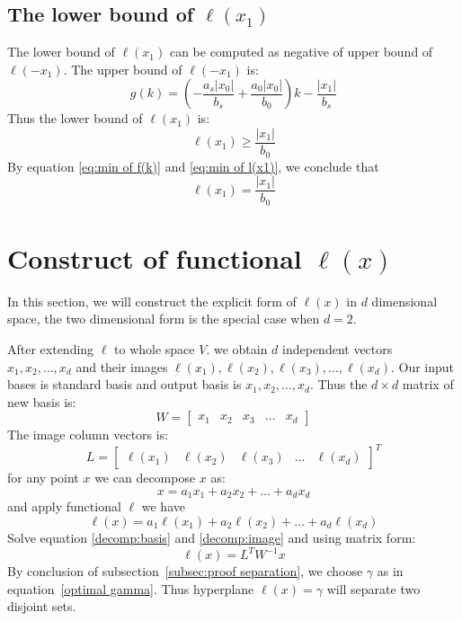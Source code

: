 \documentclass{article}
\newcommand{\abs}[1]{\left\lvert#1\right\rvert}
\begin{document}
\subsection{The lower bound of $\ell(x_1)$}
The lower bound of $\ell(x_1)$ can be computed as negative of upper bound of $\ell(-x_1)$. The upper bound of $\ell(-x_1)$ is:
\begin{equation}
	g(k)=\left(-\frac{a_s\abs{x_0}}{b_s}+\frac{a_0\abs{x_0}}{b_0}\right)k-\frac{\abs{x_1}}{b_s}
\end{equation}
Thus the lower bound of $\ell(x_1)$ is:
\begin{equation}
	\label{eq:min of l(x1)}
	\ell(x_1)\geq\frac{\abs{x_1}}{b_0}
\end{equation}
By equation \eqref{eq:min of f(k)} and \eqref{eq:min of l(x1)}, we conclude that
\begin{equation}
	\ell(x_1)=\frac{\abs{x_1}}{b_0}
\end{equation}
\section{Construct of functional $\ell(x)$}
In this section, we will construct the explicit form of $\ell(x)$ in $d$ dimensional space, the two dimensional form is the special case when $d=2$.\par
After extending $\ell$ to whole space $V$. we obtain $d$ independent vectors $x_1,x_2,\dots,x_d$ and their images 
$\ell(x_1),\ell(x_2),\ell(x_3),\dots,\ell(x_d)$. Our input bases is standard basis and output basis
is $x_1,x_2,\dots,x_d$. Thus the $d\times d$ matrix of new basis is:
\[
	W=
	\begin{bmatrix}
		x_1 & x_2 & x_3 & \dots & x_d
	\end{bmatrix}
\]
The image column vectors is:
\[
	L=
	\begin{bmatrix}
		\ell(x_1) & \ell(x_2) & \ell(x_3) & \dots & \ell(x_d)
	\end{bmatrix}^T
\]
for any point $x$ we can decompose $x$ as:
\begin{equation}\label{decomp:basis}
	x=a_1x_1+a_2x_2+\dots+a_dx_d
\end{equation}
and apply functional $\ell$ we have
\begin{equation}\label{decomp:image}
	\ell(x)=a_1\ell(x_1)+a_2\ell(x_2)+\dots+a_d\ell(x_d)
\end{equation}
Solve equation \eqref{decomp:basis} and \eqref{decomp:image} and using matrix form:
\begin{equation*}
	\ell(x)=L^TW^{-1}x
\end{equation*}
By conclusion of subsection~\ref{subsec:proof separation}, we choose $\gamma$ as in equation~\ref{optimal gamma}. Thus hyperplane $\ell(x)=\gamma$
will separate two disjoint sets.\par
\end{document}
